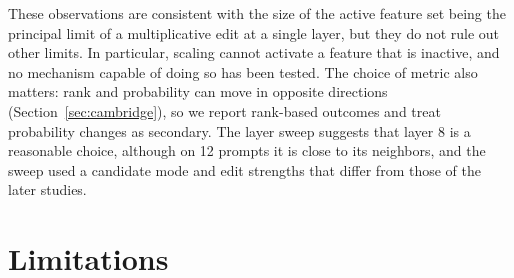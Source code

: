 \documentclass[conference]{IEEEtran}
\begin{document}
These observations are consistent with the size of the active feature set being the principal limit of a multiplicative edit at a single layer, but they do not rule out other limits. In particular, scaling cannot activate a feature that is inactive, and no mechanism capable of doing so has been tested. The choice of metric also matters: rank and probability can move in opposite directions (Section~\ref{sec:cambridge}), so we report rank-based outcomes and treat probability changes as secondary. The layer sweep suggests that layer 8 is a reasonable choice, although on 12 prompts it is close to its neighbors, and the sweep used a candidate mode and edit strengths that differ from those of the later studies.

\section{Limitations}
\label{sec:limits}
\end{document}
